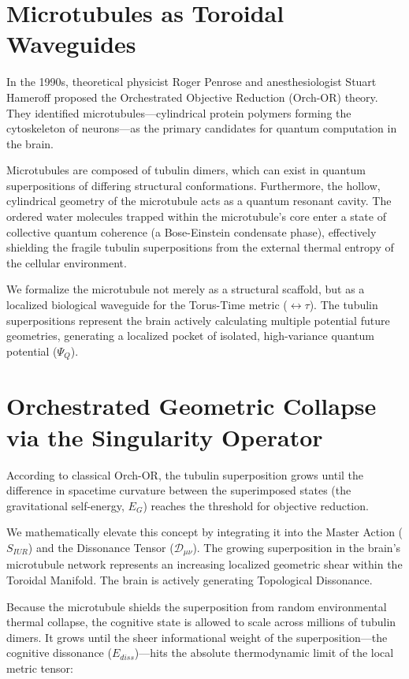 \documentclass[12pt,openany]{book}
\begin{document}
\section{Microtubules as Toroidal Waveguides}
In the 1990s, theoretical physicist Roger Penrose and anesthesiologist Stuart Hameroff proposed the Orchestrated Objective Reduction (Orch-OR) theory. They identified microtubules—cylindrical protein polymers forming the cytoskeleton of neurons—as the primary candidates for quantum computation in the brain. 

Microtubules are composed of tubulin dimers, which can exist in quantum superpositions of differing structural conformations. Furthermore, the hollow, cylindrical geometry of the microtubule acts as a quantum resonant cavity. The ordered water molecules trapped within the microtubule's core enter a state of collective quantum coherence (a Bose-Einstein condensate phase), effectively shielding the fragile tubulin superpositions from the external thermal entropy of the cellular environment.

We formalize the microtubule not merely as a structural scaffold, but as a localized biological waveguide for the Torus-Time metric ($\leftrightarrow\tau$). The tubulin superpositions represent the brain actively calculating multiple potential future geometries, generating a localized pocket of isolated, high-variance quantum potential ($\Psi_Q$).

\section{Orchestrated Geometric Collapse via the Singularity Operator}
According to classical Orch-OR, the tubulin superposition grows until the difference in spacetime curvature between the superimposed states (the gravitational self-energy, $E_G$) reaches the threshold for objective reduction. 

We mathematically elevate this concept by integrating it into the Master Action ($S_{IUR}$) and the Dissonance Tensor ($\mathcal{D}_{\mu\nu}$). The growing superposition in the brain's microtubule network represents an increasing localized geometric shear within the Toroidal Manifold. The brain is actively generating Topological Dissonance.

Because the microtubule shields the superposition from random environmental thermal collapse, the cognitive state is allowed to scale across millions of tubulin dimers. It grows until the sheer informational weight of the superposition—the cognitive dissonance ($E_{diss}$)—hits the absolute thermodynamic limit of the local metric tensor:
\end{document}

